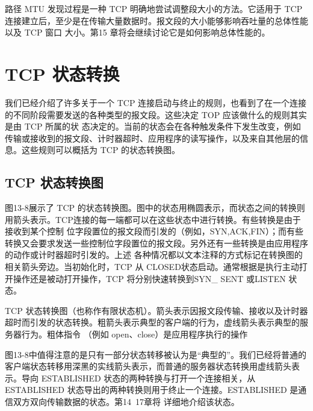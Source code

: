 路径 MTU 发现过程是一种 TCP 明确地尝试调整段大小的方法。它适用于 TCP 连接建立后，至少是在传输大量数据时。报文段的大小能够影响吞吐量的总体性能以及 TCP 窗口
大小。第15 章将会继续讨论它是如何影响总体性能的。
\section{TCP 状态转换}
我们已经介绍了许多关于一个 TCP 连接启动与终止的规则，也看到了在一个连接的不同阶段需要发送的各种类型的报文段。这些决定 TOP 应该做什么的规则其实是由 TCP 所属的状
态决定的。当前的状态会在各种触发条件下发生改变，例如传输或接收到的报文段、计时器超时、应用程序的读写操作，以及来自其他层的信息。这些规则可以概括为 TCP 的状态转换图。

\subsection{TCP 状态转换图}
图13-8展示了 TCP 的状态转换图。图中的状态用椭圆表示，而状态之间的转换则用箭头表示。TCP连接的每一端都可以在这些状态中进行转换。有些转换是由于接收到某个控制
位字段置位的报文段而引发的（例如，SYN,ACK,FIN）；而有些转换又会要求发送一些控制位字段置位的报文段。另外还有一些转换是由应用程序的动作或计时器超时引发的。上述
各种情况都以文本注释的方式标记在转换图的相关箭头旁边。当初始化时，TCP 从 CLOSED状态启动。通常根据是执行主动打开操作还是被动打开操作，TCP 将分别快速转换到SYN\_
SENT 或LISTEN 状态。

TCP 状态转换图（也称作有限状态机）。箭头表示因报文段传输、接收以及计时器超时而引发的状态转换。粗箭头表示典型的客户端的行为，虚线箭头表示典型的服务器行为。粗体指令
（例如 open、close）是应用程序执行的操作

图13-8中值得注意的是只有一部分状态转移被认为是“典型的”。我们已经将普通的客户端状态转移用深黑的实线箭头表示，而普通的服务器状态转换用虚线箭头表示。导向
ESTABLISHED 状态的两种转换与打开一个连接相关，从ESTABLISHED 状态导出的两种转换则用于终止一个连接。ESTABLISHED 是通信双方双向传输数据的状态。第14~17章将
详细地介绍该状态。


